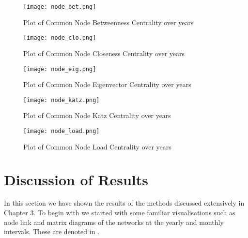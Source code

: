 \begin{figure}[!htp]
    \centering
    \texttt{[image: node\_bet.png]}
    \caption{Plot of Common Node Betweenness Centrality over years}
    \label{fig: Plot of Common Node Betweenness Centrality over years}
\end{figure}

\begin{figure}[!htp]
    \centering
    \texttt{[image: node\_clo.png]}
    \caption{Plot of Common Node Closeness Centrality over years}
    \label{fig: Plot of Common Node Closeness Centrality over years}
\end{figure}

\begin{figure}[!htp]
    \centering
    \texttt{[image: node\_eig.png]}
    \caption{Plot of Common Node Eigenvector Centrality over years}
    \label{fig: Plot of Common Node Eigenvector Centrality over years}
\end{figure}

\begin{figure}[!htp]
    \centering
    \texttt{[image: node\_katz.png]}
    \caption{Plot of Common Node Katz Centrality over years}
    \label{fig: Plot of Common Node Katz Centrality over years}
\end{figure}

\begin{figure}[!htp]
    \centering
    \texttt{[image: node\_load.png]}
    \caption{Plot of Common Node Load Centrality over years}
    \label{fig: Plot of Common Node Load Centrality over years}
\end{figure}

\clearpage{}
\section{Discussion of Results}

In this section we have shown the results of the methods discussed extensively in Chapter 3. To begin with we started with some familiar visualisations such as node link and matrix diagrams of the networks at the yearly and monthly intervals. These are denoted in .\\

